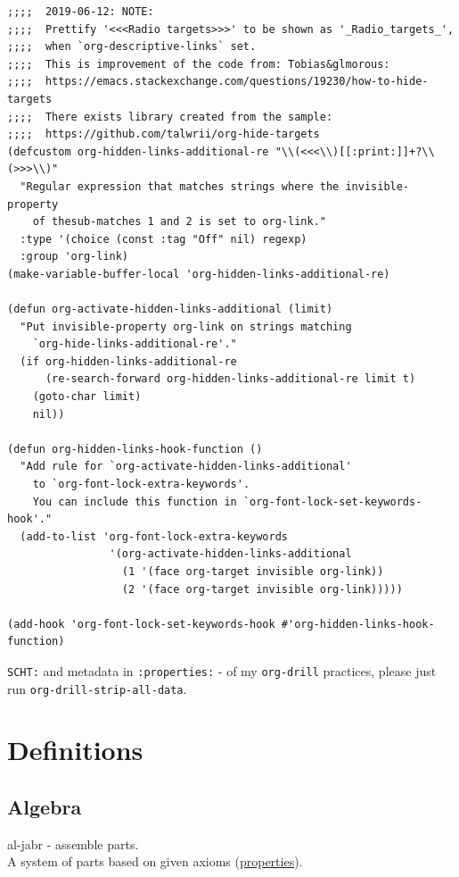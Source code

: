 \documentclass[a4paper,14pt,oneside]{book}
\begin{document}
\begin{verbatim}
;;;;  2019-06-12: NOTE:
;;;;  Prettify '<<<Radio targets>>>' to be shown as '_Radio_targets_',
;;;;  when `org-descriptive-links` set.
;;;;  This is improvement of the code from: Tobias&glmorous:
;;;;  https://emacs.stackexchange.com/questions/19230/how-to-hide-targets
;;;;  There exists library created from the sample:
;;;;  https://github.com/talwrii/org-hide-targets
(defcustom org-hidden-links-additional-re "\\(<<<\\)[[:print:]]+?\\(>>>\\)"
  "Regular expression that matches strings where the invisible-property
    of thesub-matches 1 and 2 is set to org-link."
  :type '(choice (const :tag "Off" nil) regexp)
  :group 'org-link)
(make-variable-buffer-local 'org-hidden-links-additional-re)

(defun org-activate-hidden-links-additional (limit)
  "Put invisible-property org-link on strings matching
    `org-hide-links-additional-re'."
  (if org-hidden-links-additional-re
      (re-search-forward org-hidden-links-additional-re limit t)
    (goto-char limit)
    nil))

(defun org-hidden-links-hook-function ()
  "Add rule for `org-activate-hidden-links-additional'
    to `org-font-lock-extra-keywords'.
    You can include this function in `org-font-lock-set-keywords-hook'."
  (add-to-list 'org-font-lock-extra-keywords
                '(org-activate-hidden-links-additional
                  (1 '(face org-target invisible org-link))
                  (2 '(face org-target invisible org-link)))))

(add-hook 'org-font-lock-set-keywords-hook #'org-hidden-links-hook-function)
\end{verbatim}

\texttt{SCHT:} and metadata in \texttt{:properties:} - of my \texttt{org-drill} practices, please just run \texttt{org-drill-strip-all-data}.\\

\part{Definitions}
\label{sec:org5ea4a8a}
\chapter{\label{org7783989}Algebra}
\label{sec:org4e238f0}
al-jabr - assemble parts.\\
A system of parts based on given axioms (\hyperref[org25713c8]{properties}).\\
\end{document}

